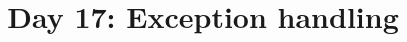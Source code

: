 \documentclass{article}
\begin{document}
\title{Day 17: Exception handling}
\author{}
\date{}

\maketitle


\end{document}
